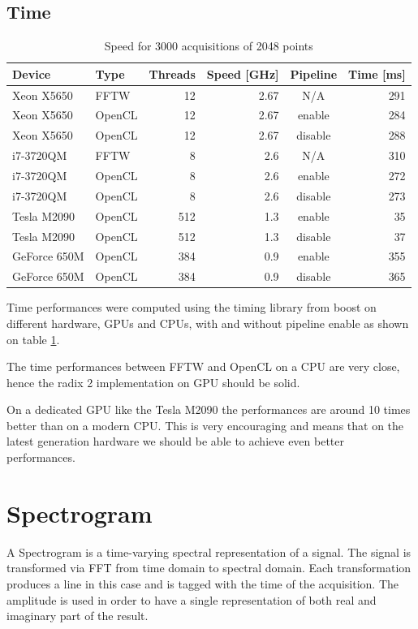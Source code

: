\subsection{Time}

\begin{table}[H]
\caption{Speed for 3000 acquisitions of 2048 points}
\centering
\label{tab:speed}
\begin{tabular}{|l|lrrcr|}
\hline
Device & Type & Threads & Speed [GHz] & Pipeline & Time [ms] \\
\hline
\hline
Xeon X5650 & FFTW & 12 & 2.67 & N/A & 291 \\
Xeon X5650 & OpenCL & 12 & 2.67 & enable & 284 \\
Xeon X5650 & OpenCL & 12 & 2.67 & disable & 288 \\
\hline
i7-3720QM & FFTW & 8 & 2.6 & N/A & 310 \\
i7-3720QM & OpenCL & 8 & 2.6 & enable & 272 \\
i7-3720QM & OpenCL & 8 & 2.6 & disable & 273 \\
\hline
\hline
Tesla M2090 & OpenCL & 512 & 1.3 & enable & 35 \\
Tesla M2090 & OpenCL & 512 & 1.3 & disable & 37 \\
\hline
GeForce 650M & OpenCL & 384 & 0.9 & enable & 355 \\
GeForce 650M & OpenCL & 384 & 0.9 & disable & 365 \\
\hline
\end{tabular}
\end{table}

Time performances were computed using the timing library from boost \cite{boost} on different hardware, \glspl{GPU} and \glspl{CPU}, with and without pipeline enable as shown on table \ref{tab:speed}.

The time performances between \gls{FFTW} and \gls{OpenCL} on a \gls{CPU} are very close, hence the radix 2 implementation on \gls{GPU} should be solid.

On a dedicated \gls{GPU} like the Tesla M2090  the performances are around 10 times better than on a modern \gls{CPU}. This is very encouraging and means that on the latest generation hardware we should be able to achieve even better performances.

\section{Spectrogram}
\label{sec:spectrogram}

A Spectrogram is a time-varying spectral representation of a
signal. The signal is transformed via \gls{FFT} from time domain to
spectral domain. Each transformation produces a line in this case and
is tagged with the time of the acquisition. The amplitude is used in
order to have a single representation of both real and imaginary part
of the result.

